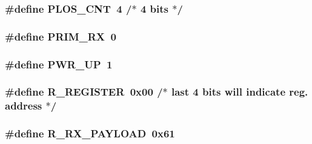\hypertarget{a00013_af45c13e8941613c7eb931001ab964965}{
\subsubsection[{P\-L\-O\-S\-\_\-\-C\-N\-T}]{\setlength{\rightskip}{0pt plus 5cm}\#define P\-L\-O\-S\-\_\-\-C\-N\-T~4 /$\ast$ 4 bits $\ast$/}}\label{a00013_af45c13e8941613c7eb931001ab964965}
\hypertarget{a00013_a0b4d92f3ecccb150d4cb1cb5d0f9d4e6}{
\subsubsection[{P\-R\-I\-M\-\_\-\-R\-X}]{\setlength{\rightskip}{0pt plus 5cm}\#define P\-R\-I\-M\-\_\-\-R\-X~0}}\label{a00013_a0b4d92f3ecccb150d4cb1cb5d0f9d4e6}
\hypertarget{a00013_af0dbd9e4c17ba0db357fcb2cedd4aa6d}{
\subsubsection[{P\-W\-R\-\_\-\-U\-P}]{\setlength{\rightskip}{0pt plus 5cm}\#define P\-W\-R\-\_\-\-U\-P~1}}\label{a00013_af0dbd9e4c17ba0db357fcb2cedd4aa6d}
\hypertarget{a00013_afb0b251378d3b14c508e51fd2c3157d6}{
\subsubsection[{R\-\_\-\-R\-E\-G\-I\-S\-T\-E\-R}]{\setlength{\rightskip}{0pt plus 5cm}\#define R\-\_\-\-R\-E\-G\-I\-S\-T\-E\-R~0x00 /$\ast$ last 4 bits will indicate reg. address $\ast$/}}\label{a00013_afb0b251378d3b14c508e51fd2c3157d6}
\hypertarget{a00013_a462d8c2314b823b724574c1ca73225a6}{
\subsubsection[{R\-\_\-\-R\-X\-\_\-\-P\-A\-Y\-L\-O\-A\-D}]{\setlength{\rightskip}{0pt plus 5cm}\#define R\-\_\-\-R\-X\-\_\-\-P\-A\-Y\-L\-O\-A\-D~0x61}}\label{a00013_a462d8c2314b823b724574c1ca73225a6}
